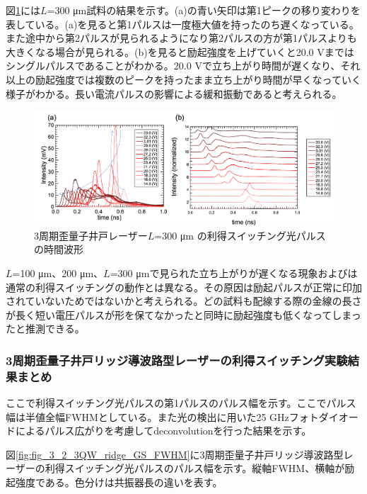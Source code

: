 {{図\ref{fig:fig_3_2_3QW_ridge_L300_GS}には$L$=300 \si{\micro\metre}試料の結果を示す。(a)の青い矢印は第1ピークの移り変わりを表している。(a)を見ると第1パルスは一度極大値を持ったのち遅くなっている。また途中から第2パルスが見られるようになり第2パルスの方が第1パルスよりも大きくなる場合が見られる。(b)を見ると励起強度を上げていくと20.0 Vまではシングルパルスであることがわかる。20.0 Vで立ち上がり時間が遅くなり、それ以上の励起強度では複数のピークを持ったまま立ち上がり時間が早くなっていく様子がわかる。長い電流パルスの影響による緩和振動であると考えられる。
\begin{figure}[h]
	\centering
	\includegraphics[width=15cm]{figure/fig_3_2_3QW_ridge_L300_GS.png}
		\caption{3周期歪量子井戸レーザー$ L$=300 \si{\micro\metre} の利得スイッチング光パルスの時間波形}
		\label{fig:fig_3_2_3QW_ridge_L300_GS}
\end{figure}


$L$=100 \si{\micro\metre}、200 \si{\micro\metre}、$L$=300 \si{\micro\metre}で見られた立ち上がりが遅くなる現象およびは通常の利得スイッチングの動作とは異なる。その原因は励起パルスが正常に印加されていないためではないかと考えられる。どの試料も配線する際の金線の長さが長く短い電圧パルスが形を保てなかったと同時に励起強度も低くなってしまったと推測できる。
\subsubsection{3周期歪量子井戸リッジ導波路型レーザーの利得スイッチング実験結果まとめ}
ここで利得スイッチング光パルスの第1パルスのパルス幅を示す。ここでパルス幅は半値全幅FWHMとしている。また光の検出に用いた25 GHzフォトダイオードによるパルス広がりを考慮してdeconvolutionを行った結果を示す。

図\ref{fig:fig_3_2_3QW_ridge_GS_FWHM}に3周期歪量子井戸リッジ導波路型レーザーの利得スイッチング光パルスのパルス幅を示す。縦軸FWHM、横軸が励起強度である。色分けは共振器長の違いを表す。

}}
